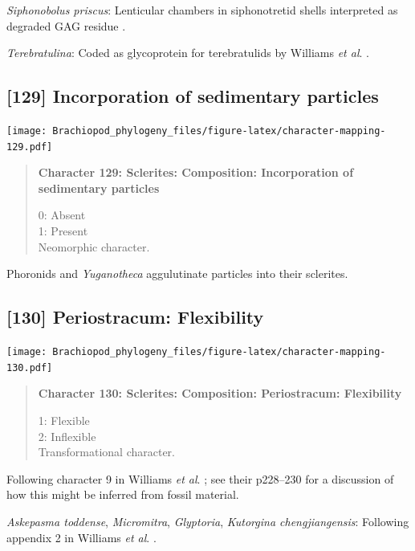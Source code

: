 \documentclass[openany]{book}
\begin{document}
\hypertarget{Siphonobolus_priscus-coding-128}{}
\emph{Siphonobolus priscus}: Lenticular chambers in siphonotretid shells
interpreted as degraded GAG residue
\citep{Williams2004Chemicostructure}.

\hypertarget{Terebratulina-coding-128}{}
\emph{Terebratulina}: Coded as glycoprotein for terebratulids by
Williams \emph{et al}. \citeyearpar{Williams1996Asupra}.

\subsection*{{[}129{]} Incorporation of sedimentary
particles}\label{incorporation-of-sedimentary-particles}

\texttt{[image: Brachiopod\_phylogeny\_files/figure-latex/character-mapping-129.pdf]}

\begin{quote}
\textbf{Character 129: Sclerites: Composition: Incorporation of
sedimentary particles}

0: Absent\\
1: Present\\
Neomorphic character.
\end{quote}

Phoronids and \emph{Yuganotheca} aggulutinate particles into their
sclerites.

\subsection*{{[}130{]} Periostracum:
Flexibility}\label{periostracum-flexibility}

\texttt{[image: Brachiopod\_phylogeny\_files/figure-latex/character-mapping-130.pdf]}

\begin{quote}
\textbf{Character 130: Sclerites: Composition: Periostracum:
Flexibility}

1: Flexible\\
2: Inflexible\\
Transformational character.
\end{quote}

Following character 9 in Williams \emph{et al}.
\citeyearpar{Williams1998Thediversity}; see their p228--230 for a
discussion of how this might be inferred from fossil material.

\hypertarget{Askepasma_toddense-coding-130}{}
\emph{Askepasma toddense}, \emph{Micromitra}, \emph{Glyptoria},
\emph{Kutorgina chengjiangensis}: Following appendix 2 in Williams
\emph{et al}. \citeyearpar{Williams1998Thediversity}.
\end{document}
